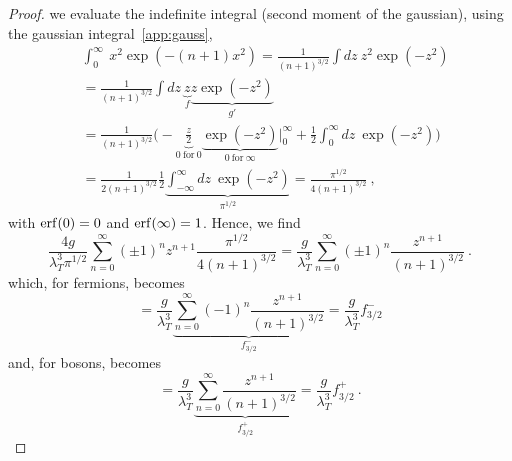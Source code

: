 \begin{proof}
        we evaluate the indefinite integral (second moment of the gaussian), using the gaussian integral~\eqref{app:gauss},
        \begin{equation}\label{proof6}
        \begin{aligned}
            & \int_0^\infty ~ x^2 \exp(-(n + 1) x^2) = \frac{1}{(n+1)^{3/2}} \int dz ~ z^2 \exp(-z^2) \\ & = \frac{1}{(n+1)^{3/2}} \int dz ~ \underbrace{z}_f \underbrace{z \exp(-z^2)}_{g'} \\ & = \frac{1}{(n+1)^{3/2}} \Big ( - \underbrace{\frac{z}{2}}_{0~\text{for}~0} \underbrace{\exp(-z^2)}_{0~\text{for}~\infty} \Big \vert_0^\infty + \frac{1}{2} \int_0^\infty dz ~ \exp(- z^2) \Big) \\ & = \frac{1}{2(n+1)^{3/2}} \frac{1}{2} \underbrace{\int_{-\infty}^\infty dz~ \exp(-z^2) }_{\pi^{1/2}} = \frac{\pi^{1/2}}{4 (n+1)^{3/2}} ~,
        \end{aligned}
        \end{equation}
        with $\operatorname{erf}(0) = 0$ and $\operatorname{erf}(\infty) = 1$. Hence, we find
        \begin{equation*}
            \frac{4 g}{\lambda_T^3 \pi^{1/2}} \sum_{n=0}^\infty (\pm 1)^n z^{n+1} \frac{\pi^{1/2}}{4 (n+1)^{3/2}} = \frac{g}{\lambda_T^3} \sum_{n=0}^\infty (\pm 1)^n \frac{z^{n+1}}{(n+1)^{3/2}} ~.
        \end{equation*}
        which, for fermions, becomes 
        \begin{equation*}
            = \frac{g}{\lambda_T^3} \underbrace{\sum_{n=0}^\infty (- 1)^n \frac{z^{n+1}}{(n+1)^{3/2}}}_{f^-_{3/2}} = \frac{g}{\lambda_T^3} f^-_{3/2} 
        \end{equation*}
        and, for bosons, becomes
        \begin{equation*}
            = \frac{g}{\lambda_T^3} \underbrace{\sum_{n=0}^\infty \frac{z^{n+1}}{(n+1)^{3/2}}}_{f^+_{3/2}} = \frac{g}{\lambda_T^3} f^+_{3/2} ~.
        \end{equation*}


\end{proof}
